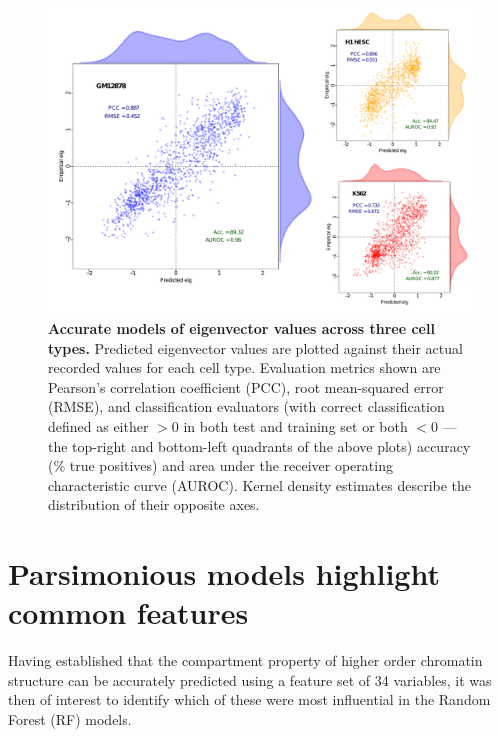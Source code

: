 \documentclass[a4paper]{report}
\begin{document}
\begin{figure}[H]
\begin{center}
\includegraphics[width=1\textwidth]{figs/f2_full.pdf}
\captionsetup{width=\textwidth}
\caption{ {\bf Accurate models of eigenvector values across three cell
    types.} Predicted eigenvector values are plotted against their
  actual recorded values for each cell type. Evaluation metrics shown
  are Pearson's correlation coefficient (PCC), 
  root mean-squared error (RMSE), and classification evaluators (with
  correct classification defined as either $>0$ in both test
  and training set or both $<0$ --- the top-right and bottom-left
  quadrants of the above plots) accuracy (\% true positives) and area
  under the receiver operating characteristic curve (AUROC). Kernel density estimates describe the
  distribution of their opposite axes.
}\label{fig:modelres}
\end{center} 
\end{figure} 

\vspace{-12pt}
\section{Parsimonious models highlight common features}
\renewcommand*{\thefootnote}{\fnsymbol{footnote}}
Having established that the compartment property of higher order
chromatin structure can be accurately predicted using a feature set of
34 variables, it was then of interest to identify which of these were
most influential in the Random Forest (RF) models. \\
\end{document}
